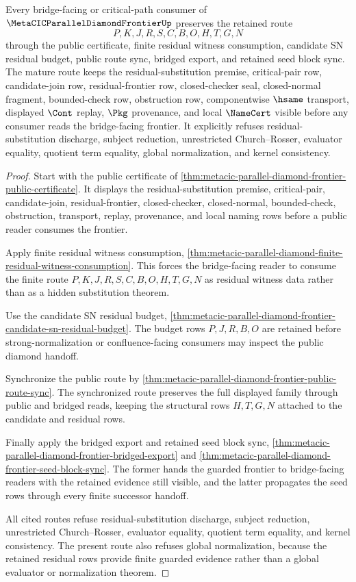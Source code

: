 \begin{theorem}
\label{thm:metacic-parallel-diamond-frontier-mature-route}
Every bridge-facing or critical-path consumer of $\MetaCICParallelDiamondFrontierUp$ preserves the retained route
$$
P,K,J,R,S,C,B,O,H,T,G,N
$$
through the public certificate, finite residual witness consumption, candidate SN residual budget, public route sync, bridged export, and retained seed block sync. The mature route keeps the residual-substitution premise, critical-pair row, candidate-join row, residual-frontier row, closed-checker seal, closed-normal fragment, bounded-check row, obstruction row, componentwise $\hsame$ transport, displayed $\Cont$ replay, $\Pkg$ provenance, and local $\NameCert$ visible before any consumer reads the bridge-facing frontier. It explicitly refuses residual-substitution discharge, subject reduction, unrestricted Church--Rosser, evaluator equality, quotient term equality, global normalization, and kernel consistency.
\end{theorem}
\begin{proof}
Start with the public certificate of \autoref{thm:metacic-parallel-diamond-frontier-public-certificate}. It displays the residual-substitution premise, critical-pair, candidate-join, residual-frontier, closed-checker, closed-normal, bounded-check, obstruction, transport, replay, provenance, and local naming rows before a public reader consumes the frontier.

Apply finite residual witness consumption, \autoref{thm:metacic-parallel-diamond-finite-residual-witness-consumption}. This forces the bridge-facing reader to consume the finite route $P,K,J,R,S,C,B,O,H,T,G,N$ as residual witness data rather than as a hidden substitution theorem.

Use the candidate SN residual budget, \autoref{thm:metacic-parallel-diamond-frontier-candidate-sn-residual-budget}. The budget rows $P,J,R,B,O$ are retained before strong-normalization or confluence-facing consumers may inspect the public diamond handoff.

Synchronize the public route by \autoref{thm:metacic-parallel-diamond-frontier-public-route-sync}. The synchronized route preserves the full displayed family through public and bridged reads, keeping the structural rows $H,T,G,N$ attached to the candidate and residual rows.

Finally apply the bridged export and retained seed block sync, \autoref{thm:metacic-parallel-diamond-frontier-bridged-export} and \autoref{thm:metacic-parallel-diamond-frontier-seed-block-sync}. The former hands the guarded frontier to bridge-facing readers with the retained evidence still visible, and the latter propagates the seed rows through every finite successor handoff.

All cited routes refuse residual-substitution discharge, subject reduction, unrestricted Church--Rosser, evaluator equality, quotient term equality, and kernel consistency. The present route also refuses global normalization, because the retained residual rows provide finite guarded evidence rather than a global evaluator or normalization theorem.
\end{proof}

